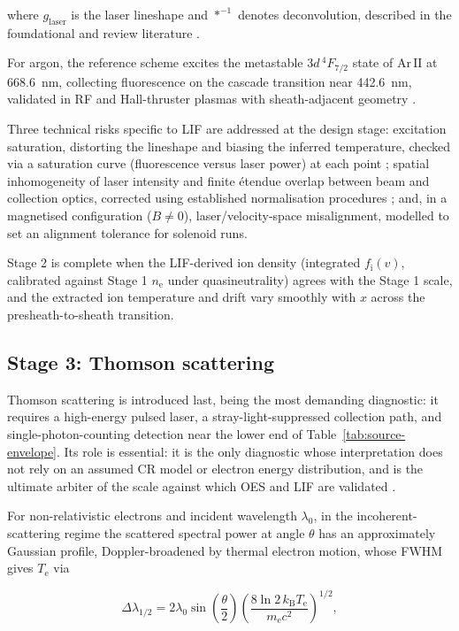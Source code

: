 where $g_{\mathrm{laser}}$ is the laser lineshape and $\ast^{-1}$ denotes deconvolution, described in the foundational and review literature \cite{ref0292,ref0300}.

For argon, the reference scheme excites the metastable $3d\,^{4}\!F_{7/2}$ state of $\mathrm{Ar\,II}$ at \SI{668.6}{\nano\meter}, collecting fluorescence on the cascade transition near \SI{442.6}{\nano\meter}, validated in RF and Hall-thruster plasmas with sheath-adjacent geometry \cite{ref0322}.

Three technical risks specific to LIF are addressed at the design stage: excitation saturation, distorting the lineshape and biasing the inferred temperature, checked via a saturation curve (fluorescence versus laser power) at each point \cite{ref0292}; spatial inhomogeneity of laser intensity and finite \'etendue overlap between beam and collection optics, corrected using established normalisation procedures \cite{ref0304}; and, in a magnetised configuration ($B \neq 0$), laser/velocity-space misalignment, modelled to set an alignment tolerance for solenoid runs.

Stage 2 is complete when the LIF-derived ion density (integrated $f_{\mathrm{i}}(v)$, calibrated against Stage 1 $n_{\mathrm{e}}$ under quasineutrality) agrees with the Stage 1 scale, and the extracted ion temperature and drift vary smoothly with $x$ across the presheath-to-sheath transition.

\subsection{Stage 3: Thomson scattering}

Thomson scattering is introduced last, being the most demanding diagnostic: it requires a high-energy pulsed laser, a stray-light-suppressed collection path, and single-photon-counting detection near the lower end of Table~\ref{tab:source-envelope}. Its role is essential: it is the only diagnostic whose interpretation does not rely on an assumed CR model or electron energy distribution, and is the ultimate arbiter of the scale against which OES and LIF are validated \cite{ref0383,ref0384}.

For non-relativistic electrons and incident wavelength $\lambda_{0}$, in the incoherent-scattering regime the scattered spectral power at angle $\theta$ has an approximately Gaussian profile, Doppler-broadened by thermal electron motion, whose FWHM gives $T_{\mathrm{e}}$ via

\begin{equation}
\Delta \lambda_{1/2} = 2 \lambda_{0} \sin\!\left(\frac{\theta}{2}\right) \left( \frac{8 \ln 2 \, k_{\mathrm{B}} T_{\mathrm{e}}}{m_{\mathrm{e}} c^{2}} \right)^{1/2},
\label{eq:thomson-width}
\end{equation}

